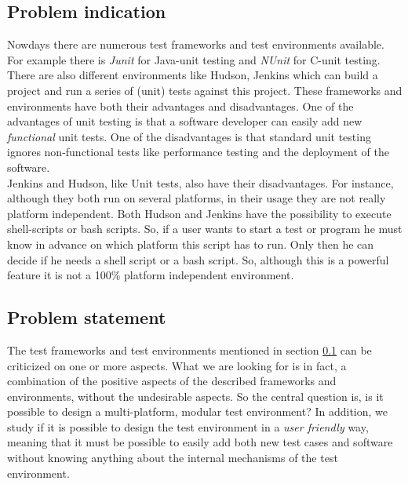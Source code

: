 \documentclass{article}
\newcommand{\CS}{C\nolinebreak\hspace{-.05em}\raisebox{.6ex}{\bf \#}}
\begin{document}
\subsection{Problem indication}
\label{subsec:Problemindication}
Nowdays there are numerous test frameworks and test environments available. For example there is \emph{Junit}\cite{Junit} for Java-unit testing and \emph{NUnit}\cite{Nunit} for \CS{}-unit testing.
There are also different environments like Hudson\cite{HudsonDoc}\cite{Hudson}, Jenkins\cite{JenkinsDoc} which can build a project and run a series of (unit) tests against this project. 
These frameworks and environments have both their advantages and disadvantages. One of the advantages of unit testing is that a software developer can easily add new \emph{functional} unit tests.
One of the disadvantages is that standard unit testing ignores non-functional tests like performance testing and the deployment of the software.\\

\noindent Jenkins and Hudson, like Unit tests, also have their
disadvantages. For instance, although they both run on several platforms, in their usage they are not really platform independent. Both Hudson and Jenkins have the possibility to execute shell-scripts or 
bash scripts. So, if a user wants to start a test or program he must know in advance on which platform this script has to run. Only then he can decide if he needs a shell script or a bash script. So, although 
this is a powerful feature it is not a 100\% platform independent environment.
 
\subsection{Problem statement}
\label{subsec:Problemstatement}
The test frameworks and test environments mentioned in section \ref{subsec:Problemindication} can be criticized on one or more aspects. What we are looking for is in fact, a combination
of the positive aspects of the described frameworks and environments, without the undesirable aspects. So the central question is, is it possible to design a
multi-platform, modular test environment? In addition, we study if it is possible to design the test environment in a \emph{user friendly} way, meaning that it must
be possible to easily add both new test cases and software without knowing anything about the internal mechanisms of the test environment.\\
\end{document}
